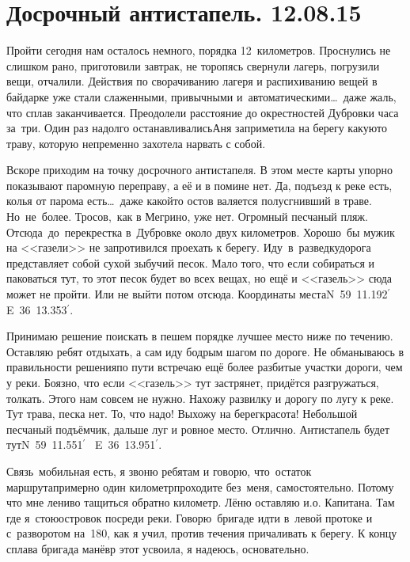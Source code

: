 \chapter{Досрочный антистапель. 12.08.15}

Пройти сегодня нам осталось немного, порядка 12~километров. Проснулись не слишком рано, приготовили завтрак, не торопясь свернули лагерь, погрузили вещи, отчалили. Действия по сворачиванию лагеря и распихиванию вещей в байдарке уже стали слаженными, привычными и~автоматическими\ldots~даже жаль, что сплав заканчивается. Преодолели расстояние до окрестностей Дубровки часа за~три. Один раз надолго останавливались\mdash Аня заприметила на берегу какую\sdash то траву, которую непременно захотела нарвать с собой. 

Вскоре приходим на точку досрочного антистапеля. В этом месте карты упорно показывают паромную переправу, а её и в помине нет. Да, подъезд к реке есть, колья от парома есть\ldots~даже какой\sdash то остов валяется полусгнивший в траве. Но~не~более. Тросов,~как в Мегрино, уже нет. Огромный песчаный пляж. Отсюда~до~перекрестка в~Дубровке около двух километров. Хорошо~бы мужик на <<газели>> не запротивился проехать к берегу. Иду~в~разведку\mdash дорога представляет собой сухой зыбучий песок. Мало того, что если собираться и паковаться тут, то этот песок будет во всех вещах, но ещё и <<газель>> сюда может не пройти. Или не выйти потом отсюда. Координаты места\mdash N~59\degree~11.192$^\prime$~ E~36\degree~13.353$^\prime$.

Принимаю решение поискать в пешем порядке лучшее место ниже по течению. Оставляю ребят отдыхать, а сам иду бодрым шагом по дороге. Не обманываюсь в правильности решения\mdash по пути встречаю ещё более разбитые участки дороги, чем у реки. Боязно, что если <<газель>> тут застрянет, придётся разгружаться, толкать. Этого нам совсем не нужно. Нахожу развилку и дорогу по лугу к реке. Тут трава, песка нет. То, что надо! Выхожу на берег\mdash красота! Небольшой песчаный подъёмчик, дальше луг и ровное место. Отлично. Антистапель будет тут\mdash N~59\degree~11.551$^\prime$~ E~36\degree~13.951$^\prime$. 

Связь~мобильная есть, я звоню ребятам и говорю, что~остаток маршрута\mdash примерно один километр\mdash проходите без~меня, самостоятельно. Потому что мне лениво тащиться обратно километр. Лёню оставляю и.о. Капитана. Там где я~стою\mdash островок посреди реки. Говорю~бригаде идти в~левой протоке и с~разворотом на~180\degree, как я учил, против течения причаливать к берегу. К концу сплава бригада манёвр этот усвоила, я надеюсь, основательно. 

